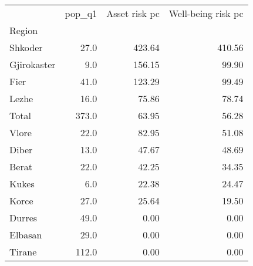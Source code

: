 \begin{tabular}{lrrr}
\toprule
{} &  pop\_q1 &  Asset risk pc &  Well-being risk pc \\
Region      &         &                &                     \\
\midrule
Shkoder     &    27.0 &         423.64 &              410.56 \\
Gjirokaster &     9.0 &         156.15 &               99.90 \\
Fier        &    41.0 &         123.29 &               99.49 \\
Lezhe       &    16.0 &          75.86 &               78.74 \\
Total       &   373.0 &          63.95 &               56.28 \\
Vlore       &    22.0 &          82.95 &               51.08 \\
Diber       &    13.0 &          47.67 &               48.69 \\
Berat       &    22.0 &          42.25 &               34.35 \\
Kukes       &     6.0 &          22.38 &               24.47 \\
Korce       &    27.0 &          25.64 &               19.50 \\
Durres      &    49.0 &           0.00 &                0.00 \\
Elbasan     &    29.0 &           0.00 &                0.00 \\
Tirane      &   112.0 &           0.00 &                0.00 \\
\bottomrule
\end{tabular}
